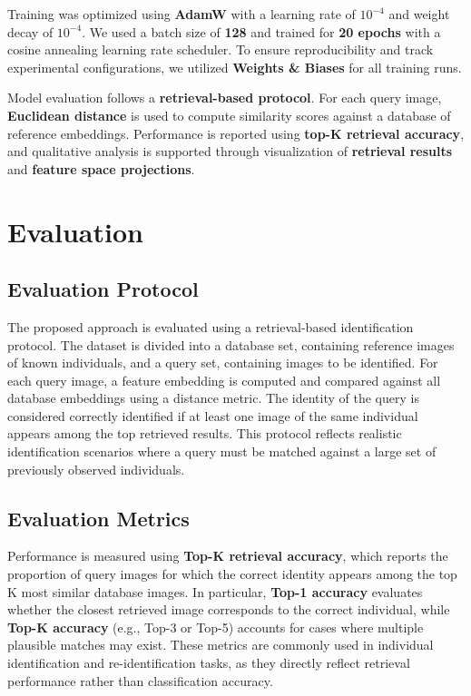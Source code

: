 \documentclass{article}
\begin{document}
Training was optimized using \textbf{AdamW} with a learning rate of $10^{-4}$ and weight decay of $10^{-4}$. We used a batch size of \textbf{128} and trained for \textbf{20 epochs} with a cosine annealing learning rate scheduler. To ensure reproducibility and track experimental configurations, we utilized \textbf{Weights \& Biases} for all training runs.

Model evaluation follows a \textbf{retrieval-based protocol}. For each query image, \textbf{Euclidean distance} is used to compute similarity scores against a database of reference embeddings. Performance is reported using \textbf{top-K retrieval accuracy}, and qualitative analysis is supported through visualization of \textbf{retrieval results} and \textbf{feature space projections}.

\section{Evaluation}
\subsection{Evaluation Protocol}
The proposed approach is evaluated using a retrieval-based identification protocol. The dataset is divided into a database set, containing reference images of known individuals, and a query set, containing images to be identified. For each query image, a feature embedding is computed and compared against all database embeddings using a distance metric. The identity of the query is considered correctly identified if at least one image of the same individual appears among the top retrieved results. This protocol reflects realistic identification scenarios where a query must be matched against a large set of previously observed individuals.

\subsection{Evaluation Metrics}
Performance is measured using \textbf{Top-K retrieval accuracy}, which reports the proportion of query images for which the correct identity appears among the top K most similar database images. In particular, \textbf{Top-1 accuracy} evaluates whether the closest retrieved image corresponds to the correct individual, while \textbf{Top-K accuracy} (e.g., Top-3 or Top-5) accounts for cases where multiple plausible matches may exist. These metrics are commonly used in individual identification and re-identification tasks, as they directly reflect retrieval performance rather than classification accuracy.
\end{document}

